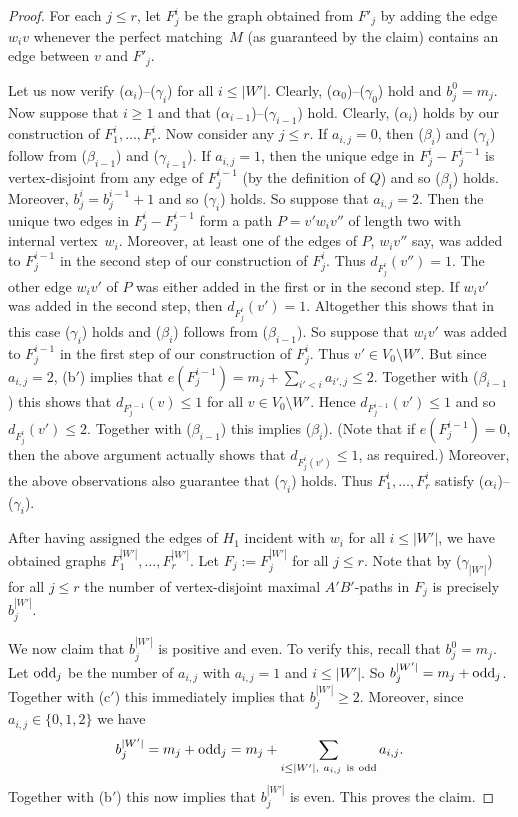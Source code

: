 \documentclass{memo-l}
\numberwithin{section}{chapter}
\numberwithin{equation}{section}
\numberwithin{firstthm}{section}
\numberwithin{figure}{section}
\begin{document}
{\begin{proof}
\medskip

For each $j\le r$, let $F^i_j$ be the graph obtained from $F'_j$ by adding the edge $w_iv$ whenever the perfect matching~$M$ 
(as guaranteed by the claim) contains
an edge between $v$ and $F'_j$.

Let us now verify ($\alpha_i$)--($\gamma_i$) for all $i \le |W'|$. Clearly, ($\alpha_0$)--($\gamma_0$) hold and $b_j^0=m_j$.
Now suppose that $i \ge 1$ and that ($\alpha_{i-1}$)--($\gamma_{i-1}$) hold.
Clearly, ($\alpha_i$) holds by our construction of $F^i_1,\dots,F^i_r$. 
Now consider any $j\le r$. If $a_{i,j} = 0$, then ($\beta_i$) and ($\gamma_i$) follow from ($\beta_{i-1}$) and ($\gamma_{i-1}$).
If $a_{i,j} = 1$, then the unique edge in $F^i_j-F_j^{i-1}$ is vertex-disjoint from any edge of $F_j^{i-1}$ (by the definition of $Q$)
and so ($\beta_i$) holds.
Moreover, $b_j^i = b_j^{i-1}+1$ and so ($\gamma_i$) holds. 
So suppose that $a_{i,j} = 2$. Then the unique two edges in $F_j^{i} - F_j^{i-1}$ form a path $P=v'w_iv''$ of length two with internal vertex~$w_i$.
Moreover, at least one of the edges of $P$, $w_iv''$ say, was added to $F_j^{i-1}$ in the second step of our construction of $F^i_j$.
Thus $d_{F^i_j}(v'')=1$. The other edge $w_iv'$ of $P$ was either added in the first or in the second step.
If $w_iv'$ was added in the second step, then $d_{F^i_j}(v')=1$. Altogether this shows that in this case
($\gamma_i$) holds and ($\beta_i$) follows from ($\beta_{i-1}$).
So suppose that $w_iv'$ was added to $F_j^{i-1}$ in the first step of our construction of $F^i_j$.
Thus $v'\in V_0\setminus W'$. But since $a_{i,j} = 2$, (b$'$) implies that $e(F_{j}^{i-1}) = m_j + \sum_{i' < i } a_{i',j} \le 2$.
Together with ($\beta_{i-1}$) this shows that $d_{F_{j}^{i-1}}(v) \le 1$ for all $v \in V_0 \setminus W'$.
Hence $d_{F_{j}^{i-1}}(v') \le 1$ and so $d_{F_{j}^{i}}(v') \le 2$. Together with ($\beta_{i-1}$) this implies ($\beta_i$).
(Note that if $e(F_j^{i-1})=0$, then the above argument actually shows that $d_{F_j^i(v')} \le 1$, as required.)
Moreover, the above observations also guarantee that ($\gamma_i$) holds. Thus $F^i_1,\dots,F^i_r$ satisfy ($\alpha_i$)--($\gamma_i$).

After having assigned the edges of $H_1$ incident with $w_i$ for all $i\le |W'|$, we have obtained graphs
$F^{|W'|}_1,\dots,F^{|W'|}_r$. Let $F_j:=F^{|W'|}_j$ for all $j\le r$. Note that by ($\gamma_{|W'|}$) for all $j\le r$
the number of vertex-disjoint maximal $A'B'$-paths in $F_j$ is precisely $b^{|W'|}_j$. 


We now claim that $b_j^{|W'|}$ is positive and even.
To verify this,  recall that $b_j^0=m_j$. Let ${\rm odd}_j$ be the number of $a_{i,j}$ with $a_{i,j}=1$ and $i \le |W'|$.
So $b_j^{|W'|}=m_j+{\rm odd}_j$.
Together with (c$'$) this immediately implies that $b_j^{|W'|} \ge 2$.
Moreover,  since $a_{i,j} \in \{0,1,2 \}$ we have
$$
b_j^{|W'|}=m_j+{\rm odd}_j=m_j+\sum_{i \le |W'|,\ a_{i,j} {\rm \ is\ odd}} a_{i,j}.
$$
Together with (b$'$) this now implies that $b_j^{|W'|}$ is even. This proves the claim.



\end{proof}}
\end{document}
